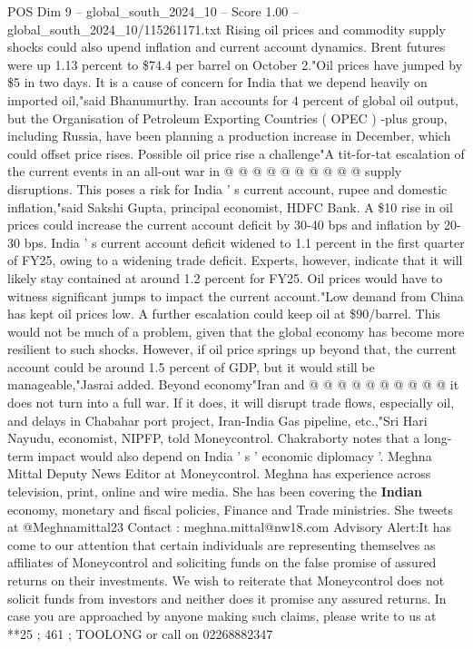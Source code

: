 \begin{textsample}{POS Dim 9 – global\_south\_2024\_10 – Score 1.00 – global\_south\_2024\_10/115261171.txt}
Rising oil prices and commodity supply shocks could also upend inflation and current account dynamics.
Brent futures were up 1.13 percent to \$74.4 per barrel on October 2."Oil prices have jumped by \$5 in two days.
It is a cause of concern for India that we depend heavily on imported oil,"said Bhanumurthy.
Iran accounts for 4 percent of global oil output, but the Organisation of Petroleum Exporting Countries ( OPEC ) -plus group, including Russia, have been planning a production increase in December, which could offset price rises.
Possible oil price rise a challenge"A tit-for-tat escalation of the current events in an all-out war in @ @ @ @ @ @ @ @ @ @ supply disruptions.
This poses a risk for India ' s current account, rupee and domestic inflation,"said Sakshi Gupta, principal economist, HDFC Bank.
A \$10 rise in oil prices could increase the current account deficit by 30-40 bps and inflation by 20-30 bps.
India ' s current account deficit widened to 1.1 percent in the first quarter of FY25, owing to a widening trade deficit.
Experts, however, indicate that it will likely stay contained at around 1.2 percent for FY25.
Oil prices would have to witness significant jumps to impact the current account."Low demand from China has kept oil prices low.
A further escalation could keep oil at \$90/barrel.
This would not be much of a problem, given that the global economy has become more resilient to such shocks.
However, if oil price springs up beyond that, the current account could be around 1.5 percent of GDP, but it would still be manageable,"Jasrai added.
Beyond economy"Iran and @ @ @ @ @ @ @ @ @ @ it does not turn into a full war.
If it does, it will disrupt trade flows, especially oil, and delays in Chabahar port project, Iran-India Gas pipeline, etc.,"Sri Hari Nayudu, economist, NIPFP, told Moneycontrol.
Chakraborty notes that a long-term impact would also depend on India ' s ' economic diplomacy '.
Meghna Mittal Deputy News Editor at Moneycontrol.
Meghna has experience across television, print, online and wire media.
She has been covering the \textbf{Indian} economy, monetary and fiscal policies, Finance and Trade ministries.
She tweets at @Meghnamittal23 Contact : meghna.mittal@nw18.com Advisory Alert:It has come to our attention that certain individuals are representing themselves as affiliates of Moneycontrol and soliciting funds on the false promise of assured returns on their investments.
We wish to reiterate that Moneycontrol does not solicit funds from investors and neither does it promise any assured returns.
In case you are approached by anyone making such claims, please write to us at **25 ; 461 ; TOOLONG or call on 02268882347

\end{textsample}
